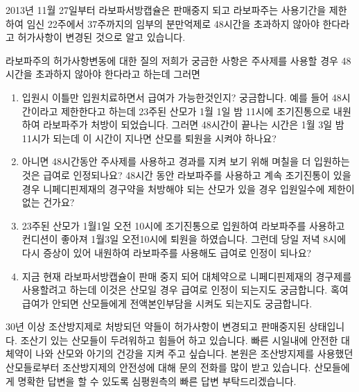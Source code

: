 2013년 11월 27일부터 라보파서방캡슐은 판매중지 되고 라보파주는 사용기간을 제한하여 임신 22주에서 37주까지의 임부의 분만억제로 48시간을 초과하지 않아야 한다라고 허가사항이 변경된 것으로 알고 있습니다. 
\begin{hemphsentense}{라보파주의 허가사항변동에 대한 질의}
저희가 궁금한 사항은 주사제를 사용할 경우 48시간을 초과하지 않아야 한다라고 하는데 그러면 
\begin{enumerate}\tightlist
\item 입원시 이틀만 입원치료하면서 급여가 가능한것인지? 궁금합니다. 예를 들어 48시간이라고 제한한다고 하는데 23주된 산모가 1월 1일 밤 11시에 조기진통으로 내원하여 라보파주가 처방이 되었습니다. 그러면 48시간이 끝나는 시간은 1월 3일 밤 11시가 되는데 이 시간이 지나면 산모를 퇴원을 시켜야 하나요? 
\item 아니면 48시간동안 주사제를 사용하고 경과를 지켜 보기 위해 며칠을 더 입원하는것은 급여로 인정되나요? 48시간 동안 라보파주를 사용하고 계속 조기진통이 있을 경우 니페디핀제재의 경구약을 처방해야 되는 산모가 있을 경우 입원일수에 제한이 없는 건가요? 
\item 23주된 산모가 1월1일 오전 10시에 조기진통으로 입원하여 라보파주를 사용하고 컨디션이 좋아져 1월3일 오전10시에 퇴원을 하였습니다. 그런데 당일 저녁 8시에 다시 증상이 있어 내원하여 라보파주를 사용해도 급여로 인정이 되나요? 
\item 지금 현재 라보파서방캡슐이 판매 중지 되어 대체약으로 니페디핀제재의 경구제를 사용할려고 하는데 이것은 산모일 경우 급여로 인정이 되는지도 궁금합니다. 혹여 급여가 안되면 산모들에게 전액본인부담을 시켜도 되는지도 궁금합니다.
\end{enumerate}
30년 이상 조산방지제로 처방되던 약들이 허가사항이 변경되고 판매중지된 상태입니다. 조산기 있는 산모들이 두려워하고 힘들어 하고 있습니다. 빠른 시일내에 안전한 대체약이 나와 산모와 아기의 건강을 지켜 주고 싶습니다. 본원은 조산방지제를 사용했던 산모들로부터 조산방지제의 안전성에 대해 문의 전화를 많이 받고 있습니다. 산모들에게 명확한 답변을 할 수 있도록 심평원측의 빠른 답변 부탁드리겠습니다. 
\end{hemphsentense}

